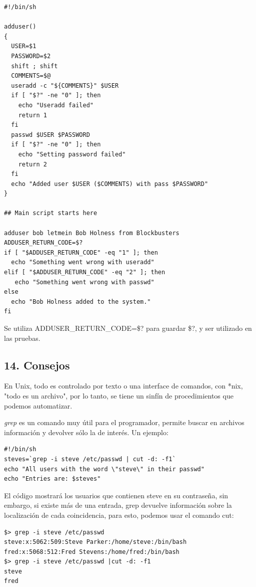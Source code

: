 \documentclass[a4paper]{article}
\begin{document}
\begin{verbatim}
#!/bin/sh

adduser()
{
  USER=$1
  PASSWORD=$2
  shift ; shift
  COMMENTS=$@
  useradd -c "${COMMENTS}" $USER
  if [ "$?" -ne "0" ]; then
    echo "Useradd failed"
    return 1
  fi
  passwd $USER $PASSWORD
  if [ "$?" -ne "0" ]; then
    echo "Setting password failed"
    return 2
  fi
  echo "Added user $USER ($COMMENTS) with pass $PASSWORD"
}

## Main script starts here

adduser bob letmein Bob Holness from Blockbusters
ADDUSER_RETURN_CODE=$?
if [ "$ADDUSER_RETURN_CODE" -eq "1" ]; then
  echo "Something went wrong with useradd"
elif [ "$ADDUSER_RETURN_CODE" -eq "2" ]; then 
   echo "Something went wrong with passwd"
else
  echo "Bob Holness added to the system."
fi
\end{verbatim}

Se utiliza ADDUSER\_RETURN\_CODE=\$? para guardar \$?, y ser utilizado en las pruebas.

\subsection*{14. Consejos}

En Unix, todo es controlado por texto o una interface de comandos, con *nix, "todo es un archivo", por lo tanto, se tiene un sinfín de procedimientos que podemos automatizar.

\textit{grep} es un comando muy útil para el programador, permite buscar en archivos información y devolver sólo la de interés. Un ejemplo:

\begin{verbatim}
#!/bin/sh
steves=`grep -i steve /etc/passwd | cut -d: -f1`
echo "All users with the word \"steve\" in their passwd"
echo "Entries are: $steves"
\end{verbatim}

El código mostrará los usuarios que contienen steve en su contraseña, sin embargo, si existe más de una entrada, grep devuelve información sobre la localización de cada coincidencia, para esto, podemos  usar el comando cut:

\begin{verbatim}
$> grep -i steve /etc/passwd 
steve:x:5062:509:Steve Parker:/home/steve:/bin/bash
fred:x:5068:512:Fred Stevens:/home/fred:/bin/bash
$> grep -i steve /etc/passwd |cut -d: -f1
steve
fred
\end{verbatim}
\end{document}
